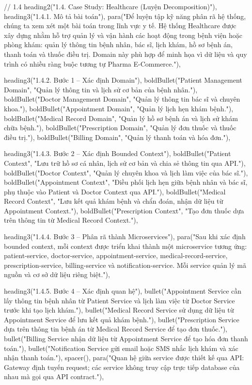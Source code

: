   // 1.4
  heading2("1.4. Case Study: Healthcare (Luyện Decomposition)"),
  heading3("1.4.1. Mô tả bài toán"),
  para("Để luyện tập kỹ năng phân rã hệ thống, chúng ta xem xét một bài toán trong lĩnh vực y tế. Hệ thống Healthcare được xây dựng nhằm hỗ trợ quản lý và vận hành các hoạt động trong bệnh viện hoặc phòng khám: quản lý thông tin bệnh nhân, bác sĩ, lịch khám, hồ sơ bệnh án, thanh toán và thuốc điều trị. Domain này phù hợp để minh họa vì dữ liệu và quy trình có nhiều ràng buộc tương tự Pharma E-Commerce."),

  heading3("1.4.2. Bước 1 – Xác định Domain"),
  boldBullet("Patient Management Domain", "Quản lý thông tin và lịch sử cơ bản của bệnh nhân."),
  boldBullet("Doctor Management Domain", "Quản lý thông tin bác sĩ và chuyên khoa."),
  boldBullet("Appointment Domain", "Quản lý lịch hẹn khám bệnh."),
  boldBullet("Medical Record Domain", "Quản lý hồ sơ bệnh án và lịch sử khám chữa bệnh."),
  boldBullet("Prescription Domain", "Quản lý đơn thuốc và thuốc điều trị."),
  boldBullet("Billing Domain", "Quản lý thanh toán và hóa đơn."),

  heading3("1.4.3. Bước 2 – Xác định Bounded Context"),
  boldBullet("Patient Context", "Lưu trữ hồ sơ cá nhân, lịch sử cơ bản và chia sẻ thông tin qua API."),
  boldBullet("Doctor Context", "Quản lý chuyên khoa và lịch làm việc của bác sĩ."),
  boldBullet("Appointment Context", "Điều phối lịch hẹn giữa bệnh nhân và bác sĩ, phụ thuộc vào Patient và Doctor Context qua API."),
  boldBullet("Medical Record Context", "Lưu kết quả khám bệnh và chẩn đoán, nhận dữ liệu từ Appointment Context."),
  boldBullet("Prescription Context", "Tạo đơn thuốc dựa trên thông tin từ Medical Record Context."),

  heading3("1.4.4. Bước 3 – Phân rã thành Microservices"),
  para("Sau khi xác định bounded context, mỗi context được triển khai thành một microservice tương ứng: patient-service, doctor-service, appointment-service, medical-record-service, prescription-service, billing-service và notification-service. Mỗi service quản lý mã nguồn và cơ sở dữ liệu riêng biệt."),

  heading3("1.4.5. Bước 4 – Xác định quan hệ"),
  bullet("Appointment Service cần lấy thông tin bệnh nhân từ Patient Service và lịch làm việc từ Doctor Service trước khi tạo lịch khám."),
  bullet("Medical Record Service sử dụng dữ liệu từ Appointment Service để lưu kết quả khám bệnh."),
  bullet("Prescription Service dựa trên thông tin bệnh án từ Medical Record Service để tạo đơn thuốc."),
  bullet("Billing Service nhận dữ liệu từ Appointment Service để tạo hóa đơn thanh toán."),
  bullet("Notification Service gửi email hoặc SMS nhắc lịch khám và xác nhận thanh toán."),
  spacer(),
  para("Quan hệ giữa service được thiết kế qua API: Gateway định tuyến request; các service không truy cập trực tiếp database của nhau mà gọi qua API contract."),

